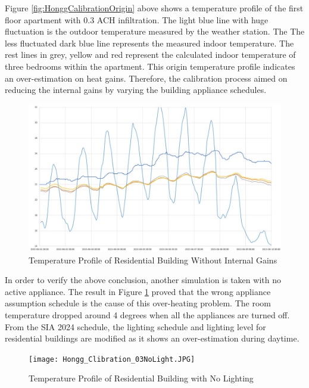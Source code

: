 			Figure \ref{fig:HonggCalibrationOrigin} above shows a temperature profile of the first floor apartment with 0.3 ACH infiltration. The light blue line with huge fluctuation is the outdoor temperature measured by the weather station. The The less fluctuated dark blue line represents the measured indoor temperature. The rest lines in grey, yellow and red represent the calculated indoor temperature of three bedrooms within the apartment. This origin temperature profile indicates an over-estimation on heat gains. Therefore, the calibration process aimed on reducing the internal gains by varying the building appliance schedules.\\
			
			\begin{figure}[H]
			\centering
			\includegraphics[scale=0.4]{Figure/Hongg_Cali_NoFacility.JPG}
			\caption{Temperature Profile of Residential Building Without Internal Gains}
			\label{fig:HonggCalibrationNoGains}
			\end{figure}
			
			In order to verify the above conclusion, another simulation is taken with no active appliance. The result in Figure \ref{fig:HonggCalibrationNoGains} proved that the wrong appliance assumption schedule is the cause of this over-heating problem. The room temperature dropped around 4 degrees when all the appliances are turned off. From the SIA 2024 schedule, the lighting schedule and lighting level for residential buildings are modified as it shows an over-estimation during daytime. \\

			\begin{figure}[H]
			\centering
			\texttt{[image: Hongg\_Clibration\_03NoLight.JPG]}
			\caption{Temperature Profile of Residential Building with No Lighting}
			\label{fig:HonggerCalibrationNoLight}
			\end{figure}

